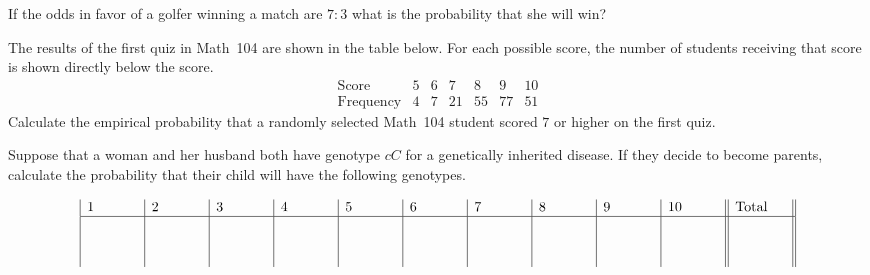 \documentclass[addpoints,12pt]{exam}
\begin{document}
\begin{questions}
\newpage

\question[8] If the odds in favor of a golfer winning a match
are $7:3$ what is the probability that she will win?
\vspace{.5in}

\question[10] The results of the first quiz in Math~104 are
shown in the table below. For each possible score, the number
of students receiving that score is shown directly below
the score.
\[\begin{array}{c|ccccccc}
\text{Score}&5&6&7&8&9&10\\\hline
\text{Frequency}&4&7&21&55&77&51
\end{array}\]
Calculate the empirical probability that a randomly
selected Math~104 student scored $7$ or higher
on the first quiz.
\vspace{2in}

\question[10]
Suppose that a woman and her husband both have genotype $cC$
for a genetically inherited disease.
If they decide to become parents, calculate the
probability that their child will
have the following genotypes.
\end{questions}

\vfill
\[\begin{array}
{|p{.5in}|p{.5in}|p{.5in}|p{.5in}|p{.5in}|p{.5in}|p{.5in}|p{.5in}|p{.5in}|p{.5in}||p{.5in}||}
1&2&3&4&5&6&7&8&9&10&\text{Total}\\\hline
\vspace{.5in}&&&&&&&&&&
\end{array}\]
\end{document}
